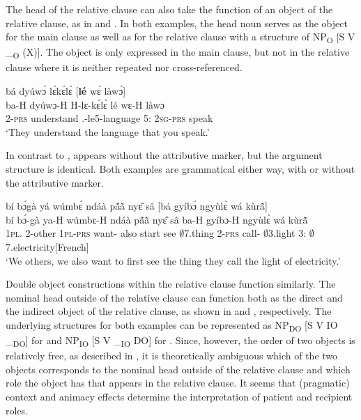 The head of the relative clause can also take the function of an object of the relative clause, as in  and . In both examples, the head noun serves as the object for the main clause as well as for the relative clause with a structure of NP\textsubscript{O} [S V \_\textsubscript{O} (X)]. The object is only expressed in the main clause, but not in the relative clause where it is neither repeated nor cross-referenced. 


\ea\label{SREL2} 
  \glll bá dyúwɔ́ lɛ́kɛ́lɛ̀ [{\bfseries lé} wɛ́ làwɔ̀]\textsubscript{{\REL}} \\
        ba-H dyúwɔ-H H-lɛ-kɛ́lɛ̀ {\db}lé wɛ-H làwɔ \\
         2-\textsc{prs} understand {\OBJ}.{\LINK}-le5-language {\db}5:{\ATT} 2\textsc{sg}-\textsc{prs} speak \\
    \trans `They understand the language that you speak.'
\z

\noindent In contrast to ,  appears without the attributive marker, but the argument structure is identical. Both examples are grammatical either way, with or without the attributive marker.


\ea\label{SREL3} 
  \glll  bí bɔ́gà yá wúmbɛ́ ndáà pã́ã̀ nyɛ̂ sâ [bá gyíbɔ́ ngyùlɛ̀ wá kùrã̂]\textsubscript{{\REL}} \\
         bí bɔ́-gà ya-H wúmbɛ-H ndáà pã́ã̀ nyɛ̂ sâ {\db}ba-H gyíbɔ-H ngyùlɛ̀ wá kùrã̂ \\
          1\textsc{pl}.{\SBJ} 2-other 1\textsc{pl}-\textsc{prs} want-{\R} also start see $\emptyset$7.thing {\db}2-\textsc{prs} call-{\R} $\emptyset$3.light 3:{\ATT} $\emptyset$7.electricity[French]  \\
    \trans `We others, we also want to first see the thing they call the light of electricity.'
\z

Double object constructions within the relative clause function similarly. The nominal head outside of the relative clause can function both as the direct and the indirect object of the relative clause, as shown in  and , respectively. The underlying structures for both examples can be represented as NP\textsubscript{DO} [S V IO \_\textsubscript{DO}]  for   and NP\textsubscript{IO} [S V \_\textsubscript{IO} DO] for .
Since, however, the order of two objects is relatively free, as described in , it is theoretically ambiguous which of the two objects corresponds to the nominal head outside of the relative clause and which role the object has that appears in the relative clause. It seems that (pragmatic) context and animacy effects determine the interpretation of patient and recipient roles.


